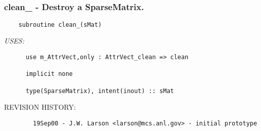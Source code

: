  
\mbox{}\hrulefill\ 
 

 \subsubsection{clean\_ - Destroy a SparseMatrix.}


 
 
\begin{verbatim} 
    subroutine clean_(sMat)\end{verbatim}{\em USES:}
\begin{verbatim}      use m_AttrVect,only : AttrVect_clean => clean
 
      implicit none
 
      type(SparseMatrix), intent(inout) :: sMat
 \end{verbatim}{\sf REVISION HISTORY:}
\begin{verbatim}        19Sep00 - J.W. Larson <larson@mcs.anl.gov> - initial prototype\end{verbatim}

